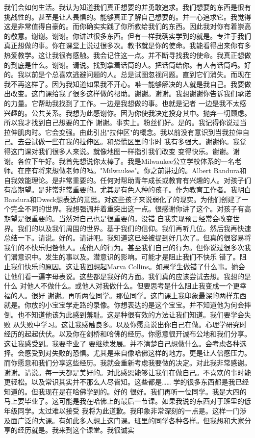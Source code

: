 我们会如何生活。我认为知道我们真正想要的并勇敢追求。我们想要的东西是很有挑战性的。甚至是让人畏惧的。能够真正了解自己想要的。并一心追求它。我觉得这是非常值得自豪的。而你确实实践了你所教给我们的东西。因此我对你有着崇高的敬意。谢谢。谢谢。你讲过很多东西。但有一样我确实学到的就是。专注于我们真正想做的事。你在课堂上说过很多次。教书就是你的使命。我能看得出来你有多热爱教学。这让我很有感触。我会记住这一点。并不断寻找我的使命。我真正想做的到底是什么。谢谢。请说。找到拿着话筒的人。把话筒给你。有人有话筒吗。好的。我以前是个总喜欢逃避问题的人。总是试图忽视问题。直到它们消失。而现在我不再这样了。因为我知道如果我不开心。唯一能够解决的人就是我自己。我要做出改变。这门课给我了很多这样做的帮助。谢谢。谢谢。我想谢谢你告诉我们承诺的力量。它帮助我找到了工作。一边是我想做的事。也就是记者 一边是我不太感兴趣的。公共关系。我想为此感谢你。因为你使我决定投身其中。抛弃一切顾虑。所以我才找到自己想要的工作 谢谢。事实上。粉丝们好。是的。我记得你说过当拉伸肌肉时。它会变强。由此引出"拉伸区"的概念。我以前没有意识到当我拉伸自己。去尝试做一些在我的拉伸区。和恐慌区里的事时 我有多强大。谢谢你。我觉得这门课对我们很多人来说。就像地图一样指引我们改变 变得快乐。谢谢。谢谢。各位下午好。我首先想说你太棒了。我是Milwaukee公立学校体系的一名老师。在座有将来想做老师的吗。"Milwaukee"。你之前讲过的。Albert Bandura和自我效能理论。是非常重要的。任何对帮助青年成长或教育有兴趣的人。对孩子们有高期望。是非常非常重要的。尤其是有色人种的孩子。作为教育工作者。我明白Bandura和Dweck想表达的意思。对这些孩子来说弱化了的现实。为他们创建了一个完全不同的世界。我想强调并着重突出这一点。很感谢你讲了这个。对孩子有高期望是很重要的。当然对自己也是很重要的。没错 自我实现预言经常会改变世界。我们的以及我们周围的世界。基于我们的信仰。我们再听几位。然后我再快速总结一下。请说。好的。请讲吧。我知道这已经被提到好几次了。但真的很容易将我们的不快乐归咎他人。或他人的行为。甚至我们自己的行为。但你说过很多次我们潜意识中。发生的事以及。潜意识的影响。可能才是阻止我们不快乐 错了。阻止我们快乐的原因。这让我回想起Marva Collins。如果学生做错了什么事。她会让他们看一遍字母表说。这些都是我好的方面。我们真的应该尝试去想。我想的是什么 对他人不做什么。或他人对我做什么。但要思考是什么阻止我变成一个更幸福的人。很好 谢谢。再听两位同学。那位同学。这门课上我印象最深的两样东西就是。你放的小宝宝学走路的录像。你想表达的是这个宝宝。并不知道他为何会摔倒。也不知道他该为此感到羞耻。这是种很有效的方法让我们知道。我们要学会失败 从失败中学习。这让我感触良多。以及你愿意说出你自己在做。心理学研究时经历的起起伏伏。以及你在剑桥和哈佛的经历。你愿意很开诚布公地和我们分享。这让我感受到。我要毕业了 要继续发展。并不清楚自己想做什么。会考虑各种选择。会感受到对失败的恐惧。尤其是来自像哈佛这样的地方。更是让人倍感压力。而你愿意和我们分享这些经历。我就会重新考虑我要做的决定。对此我非常感谢。谢谢。请说。每一天都是美好的。对此感恩能够让我们在做自己。不喜欢的事时能更轻松。以及常识其实并不那么人尽皆知。这些都是…… 学的很多东西都是我已经知道的。但我现在是在哈佛学到的。好的 很好。我们再听一位同学。我是大四的 马上要毕业了。这可能是我在哈佛上的最后一节课。如果我说的东西对于班里的低年级同学。太过难以接受 我将为此道歉。我印象非常深刻的一点是。这样一门涉及面广泛的大课。有如此多人想上这门课。班里的同学各种各样。但我想和大家分享的经历就是。我来到这个课堂。我很诚实 